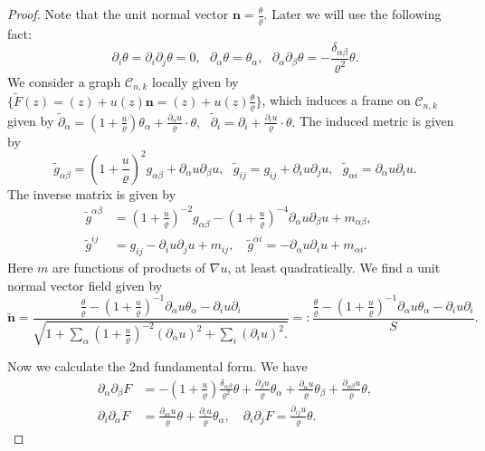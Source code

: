 \documentclass[10pt,a4paper]{amsart}
\newcommand{\bn}{\mathbf{n}}
\newcommand{\cC}{\mathcal{C}}
\newcommand{\pr}{\partial}
\begin{document}
	\begin{proof}
		
		Note that the unit normal vector $\bn=\frac{\theta}{\varrho}$. Later we will use the following fact:
		\[\pr_i \theta=\pr_i\pr_j\theta=0,\ \ \ 
		\pr_\alpha\theta=\theta_\alpha,\ \ \ \pr_{\alpha}\pr_{\beta} \theta = -\frac{\delta_{\alpha\beta}}{\varrho^2}\theta.
		\]
		We consider a graph $\cC_{n,k}$ locally given by $\{\widetilde{F}(z)=(z)+u(z)\bn= (z)+u(z)\frac{\theta}{\varrho}\}$, which induces a frame on $\cC_{n,k}$ given by
		$
		\widetilde{\pr}_\alpha=(1+\frac{u}{\varrho})\theta_{\alpha}+\frac{\pr_\alpha u}{\varrho} \cdot\theta,\ \ \ 
		\widetilde{\pr}_{i}=\pr_i +\frac{\pr_iu}{\varrho} \cdot \theta.
		$
		The induced metric is given by
		\begin{equation*}
			\widetilde{g}_{\alpha\beta}=(1+\frac{u}{\varrho})^2 g_{\alpha\beta} + \pr_\alpha u \pr_\beta u
			,
			\ \ \ 
			\widetilde{g}_{i j}
			=
			g_{ij}+\pr_i u\pr_j u
			,
			\ \ \ 
			\widetilde{g}_{\alpha i}
			=
			\pr_{\alpha} u \pr_i u.
		\end{equation*}
		The inverse matrix is given by
		\begin{equation*}
			\begin{aligned}
				\widetilde{g}^{\alpha\beta}
				&=
				(1+\frac{u}{\varrho})^{-2}g_{\alpha\beta} - (1+\frac{u}{\varrho})^{-4}\pr_\alpha u \pr_\beta u+ m_{\alpha\beta},
				\quad	\\
				\widetilde{g}^{i j}
				&=
				g_{ij} - \pr_i u\pr_j u 
				+ m_{ij},\quad 
				\widetilde{g}^{\alpha i}
				=
				-\pr_\alpha u\pr_i u
				+ m_{\alpha i}.
			\end{aligned}
		\end{equation*}
		Here $m$ are functions of products of $\nabla u$, at least quadratically.	We find a unit normal vector field given by
		\begin{equation*}
			\widetilde{\bn}
			=
			\frac{\frac{\theta}{\varrho}-(1+\frac{u}{\varrho})^{-1}\pr_\alpha u\theta_{\alpha} -\pr_i u \pr_i}
			{\sqrt{
					1+\sum_{\alpha}(1+\frac{u}{\varrho})^{-2}(\pr_\alpha u)^2	
					+\sum_i (\pr_i u)^2.
			}}
			=:
			\frac{\frac{\theta}{\varrho}-(1+\frac{u}{\varrho})^{-1}\pr_\alpha u\theta_{\alpha} -\pr_i u \pr_i}{S}.
		\end{equation*}
		
		Now we calculate the 2nd fundamental form. We have
		\begin{equation*}
			\begin{aligned}
				\pr_{\alpha}\pr_{\beta} F
				&=
				-(1+\frac{u}{\varrho})\frac{\delta_{\alpha\beta}}{\varrho^2}\theta
				+
				\frac{\pr_{\beta} u}{\varrho}\theta_{\alpha}
				+
				\frac{\pr_{\alpha }u}{\varrho}\theta_\beta
				+
				\frac{\pr_{\alpha\beta}u}{\varrho}\theta,
				\\
				\pr_i\pr_{\alpha} F
				&	=
				\frac{\pr_{i\alpha} u}{\varrho}\theta
				+\frac{\pr_i u}{\varrho}\theta_{\alpha},
				\quad		\pr_i\pr_j F
				=
				\frac{\pr_{ij}u}{\varrho}\theta.
			\end{aligned}
		\end{equation*}
		

\end{proof}
\end{document}
